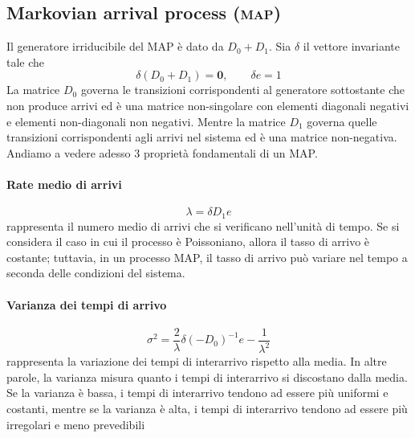 \documentclass[11pt]{article}
\begin{document}
\subsection{Markovian arrival process (\textsc{map})}

Il generatore irriducibile del MAP è dato da $D_0 + D_1$. Sia $\delta$ il vettore invariante tale che
\begin{equation} \label{eq:invariant}
    \delta (D_0 + D_1) = \textbf{0}, \qquad \delta e = 1
\end{equation}
La matrice $D_0$ governa le transizioni corrispondenti al generatore sottostante che non produce arrivi ed è una matrice non-singolare con elementi diagonali negativi e elementi non-diagonali non negativi. Mentre la matrice  $D_1$ governa quelle transizioni corrispondenti agli arrivi nel sistema ed è una matrice non-negativa. Andiamo a vedere adesso 3 proprietà fondamentali di un MAP.

\paragraph{Rate medio di arrivi}
    $$\lambda = \delta D_1 e$$
    rappresenta il numero medio di arrivi che si verificano nell'unità di tempo. Se si considera il caso in cui il processo è Poissoniano, allora il tasso di arrivo è costante; tuttavia, in un processo MAP, il tasso di arrivo può variare nel tempo a seconda delle condizioni del sistema.

\paragraph{Varianza dei tempi di arrivo}
    $$ \sigma^2 = \frac{2}{\lambda} \delta (-D_0)^{-1} e - \frac{1}{\lambda^2} $$
    rappresenta la variazione dei tempi di interarrivo rispetto alla media. In altre parole, la varianza misura quanto i tempi di interarrivo si discostano dalla media. Se la varianza è bassa, i tempi di interarrivo tendono ad essere più uniformi e costanti, mentre se la varianza è alta, i tempi di interarrivo tendono ad essere più irregolari e meno prevedibili
\end{document}
